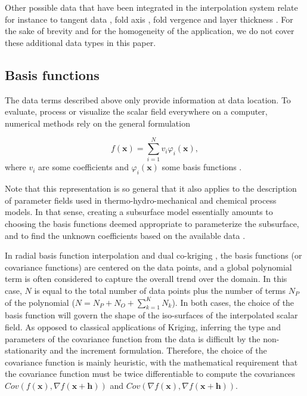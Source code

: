 \documentclass[preprint]{ring20}
\newcommand{\bx}{\mathbf{x}}
\begin{document}
Other possible data that have been integrated in the interpolation system relate for instance to tangent data \citep{Lajaunie1997MG, Caumon2013GaRSITo, Hillier2014MG}, fold axis \citep{MassiotGM2010,Hillier2014MG}, fold vergence \citep{Laurent2016EaPSL,Grose2017JSG} and layer thickness \citep{Laurent2016MG}. For the sake of brevity and for the homogeneity of the application, we do not cover these additional data types in this paper. 

\subsection{Basis functions} 

The data terms described above only provide information at data location. To evaluate, process or visualize the scalar field everywhere on a computer, numerical methods rely on the general formulation 

\begin{equation}
\label{eq:basis}
  f(\mathbf{x}) = \sum_{i=1}^{N}{v_i\varphi_i(\mathbf{x})},
\end{equation}
\noindent where $v_i$ are some coefficients and $\varphi_i(\mathbf{x})$ some basis functions \citep[e.g., ][]{Hillier2014MG,Renaudeau2019MG}.

Note that this representation is so general that it also applies to the description of parameter fields used in thermo-hydro-mechanical and chemical process models. 
In that sense, creating a subsurface model essentially amounts to choosing the basis functions deemed appropriate to parameterize the subsurface, and to find the unknown coefficients based on the available data \citep{Caumon2018HoMG,Wellmann2018AiG}.
 
In radial basis function interpolation \citep[RBF, ][]{Carr2001,Cowan2002ASGMEM,Hillier2014MG} and dual co-kriging \citep{Lajaunie1997MG}, the basis functions (or covariance functions) are centered on the data points, and a global polynomial term is often considered to capture the overall trend over the domain. In this case, $N$ is equal to the total number of data points plus the number of terms $N_P$ of the polynomial ($N = N_P + N_O + \sum_{k=1}^{K}{N_k}$). In both cases, the choice of the basis function will govern the shape of the iso-surfaces of the interpolated scalar field. As opposed to classical applications of Kriging, inferring the type and parameters of the covariance function from the data is difficult by the non-stationarity and the increment formulation. Therefore, the choice of the covariance function is mainly heuristic, with the mathematical requirement that the covariance function must be twice differentiable to compute the covariances $Cov\left(f(\bx), \nabla {f}(\bx+\mathbf{h})\right)$ and $Cov\left(\nabla f(\bx), \nabla f(\bx+\mathbf{h})\right)$. 
\end{document}
